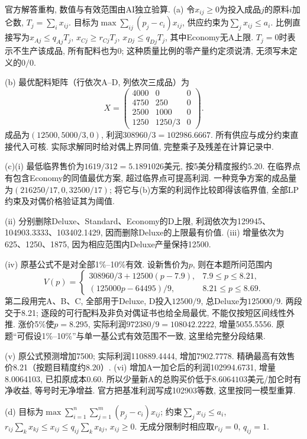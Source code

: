 \begin{solution}
官方解答重构, 数值与有效范围由AI独立验算. (a) 令$x_{ij}\ge0$为投入成品$j$的原料$i$加仑数, $T_j=\sum_i x_{ij}$. 目标为$\max\sum_{ij}(p_j-c_i)x_{ij}$, 供应约束为$\sum_jx_{ij}\le a_i$. 比例直接写为$x_{Aj}\le q_{Aj}T_j$, $x_{Cj}\ge r_{Cj}T_j$, $x_{Dj}\le q_{Dj}T_j$, 其中Economy无A上限. $T_j=0$时表示不生产该成品, 所有配料也为0; 这种质量比例的零产量约定须说清, 无须写未定义的$0/0$.

(b) 最优配料矩阵（行依次A--D, 列依次三成品）为
\[
X=\begin{pmatrix}4000&0&0\\4750&250&0\\2500&1000&0\\1250&1250/3&0\end{pmatrix}.
\]
成品为$(12500,5000/3,0)$, 利润$308960/3=102986.6667$. 所有供应与成分约束直接代入可核. 实际求解同时给对偶上界同值, 完整乘子及残差在计算记录中.

(c)(i) 最低临界售价为$1619/312=5.1891026$美元, 按5美分精度报约5.20. 在临界点有包含Economy的同值最优方案, 超过临界点可提高利润. 一种竞争方案的成品量为$(216250/17,0,32500/17)$; 将它与(b)方案的利润作比较即得该临界值, 全部LP约束及对偶价格验证其为阈值.

(ii) 分别删除Deluxe、Standard、Economy的D上限, 利润依次为129945、104903.3333、103402.1429, 因而删除Deluxe的上限最有价值. (iii) 增量依次为625、1250、1875, 因为相应范围内Deluxe产量保持12500.

(iv) 原基公式不是对全部1\%--10\%有效. 设新售价为$p$, 则在本题所问范围内
\[
V(p)=\begin{cases}
308960/3+12500(p-7.9),&7.9\le p\le8.21,\\
(125000p-64495)/9,&8.21\le p\le8.69.
\end{cases}
\]
第二段用完A、B、C, 全部用于Deluxe, D投入$12500/9$, 总Deluxe为$125000/9$. 两段交于8.21; 逐段的可行配料及非负对偶证书也给全局最优, 不能仅按短区间线性外推. 涨价5\%使$p=8.295$, 实际利润$972380/9=108042.2222$, 增量5055.5556. 原题“可假设1\%--10\%”与单一基公式有效范围不一致, 这里给完整分段结果.

(v) 原公式预测增加7500; 实际利润110889.4444, 增加7902.7778. 精确最高有效售价8.21（按题目精度约8.20）. (vi) 增加A一加仑后的利润102994.6731, 增量8.0064103, 已扣原成本0.60. 所以少量新A的总购买价低于$8.6064103$美元/加仑时有净收益, 等号时无净增益. 官方把基准利润写成102903等数, 这里按同一模型重算.

(d) 目标为$\max\sum_{i=1}^n\sum_{j=1}^m(p_j-c_i)x_{ij}$; 约束$\sum_jx_{ij}\le a_i$, $r_{ij}\sum_kx_{kj}\le x_{ij}\le q_{ij}\sum_kx_{kj}$, $x_{ij}\ge0$. 无成分限制时相应取$r_{ij}=0$, $q_{ij}=1$.
\end{solution}

